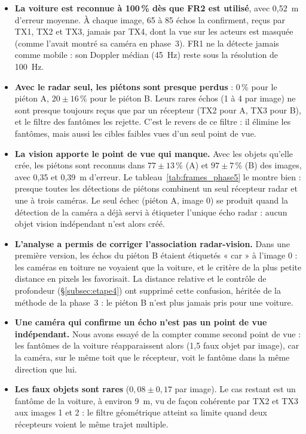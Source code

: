 \documentclass[12pt,a4paper,titlepage]{article}
\begin{document}
\begin{itemize}[leftmargin=1.5em]
    \item \textbf{La voiture est reconnue à 100\,\% dès que FR2 est utilisé}, avec 0,52~m d'erreur moyenne. À chaque image, 65 à 85 échos la confirment, reçus par TX1, TX2 et TX3, jamais par TX4, dont la vue sur les acteurs est masquée (comme l'avait montré sa caméra en phase~3). FR1 ne la détecte jamais comme mobile : son Doppler médian (45~Hz) reste sous la résolution de 100~Hz.
    \item \textbf{Avec le radar seul, les piétons sont presque perdus} : 0\,\% pour le piéton A, $20 \pm 16$\,\% pour le piéton B. Leurs rares échos (1 à 4 par image) ne sont presque toujours reçus que par un récepteur (TX2 pour A, TX3 pour B), et le filtre des fantômes les rejette. C'est le revers de ce filtre : il élimine les fantômes, mais aussi les cibles faibles vues d'un seul point de vue.
    \item \textbf{La vision apporte le point de vue qui manque.} Avec les objets qu'elle crée, les piétons sont reconnus dans $77 \pm 13$\,\% (A) et $97 \pm 7$\,\% (B) des images, avec 0,35 et 0,39~m d'erreur. Le tableau~\ref{tab:frames_phase5} le montre bien : presque toutes les détections de piétons combinent un seul récepteur radar et une à trois caméras. Le seul échec (piéton A, image 0) se produit quand la détection de la caméra a déjà servi à étiqueter l'unique écho radar : aucun objet vision indépendant n'est alors créé.
    \item \textbf{L'analyse a permis de corriger l'association radar-vision.} Dans une première version, les échos du piéton B étaient étiquetés « car » à l'image 0 : les caméras en toiture ne voyaient que la voiture, et le critère de la plus petite distance en pixels les favorisait. La distance relative et le contrôle de profondeur (\S\ref{subsec:etape4}) ont supprimé cette confusion, héritée de la méthode de la phase~3 : le piéton B n'est plus jamais pris pour une voiture.
    \item \textbf{Une caméra qui confirme un écho n'est pas un point de vue indépendant.} Nous avons essayé de la compter comme second point de vue : les fantômes de la voiture réapparaissent alors (1,5 faux objet par image), car la caméra, sur le même toit que le récepteur, voit le fantôme dans la même direction que lui.
    \item \textbf{Les faux objets sont rares} ($0{,}08 \pm 0{,}17$ par image). Le cas restant est un fantôme de la voiture, à environ 9~m, vu de façon cohérente par TX2 et TX3 aux images 1 et 2 : le filtre géométrique atteint sa limite quand deux récepteurs voient le même trajet multiple.
\end{itemize}
\end{document}
